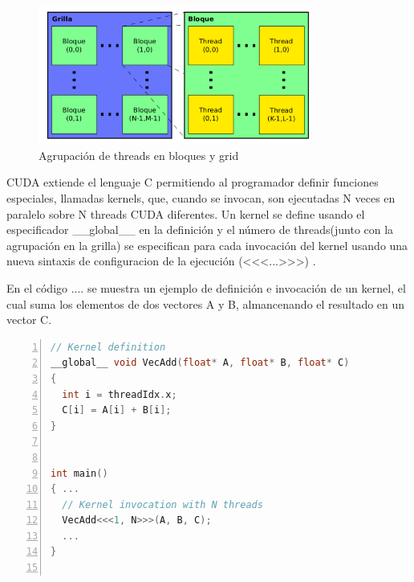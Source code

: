\documentclass[a4paper,10pt]{report}
\begin{document}
\begin{figure}
  \centering
    \includegraphics[width=0.8\textwidth]{img/grilla.png}
  \caption{Agrupación de threads en bloques y grid}
  \label{grilla}
\end{figure}
% 

CUDA extiende el lenguaje C permitiendo al programador definir funciones especiales, llamadas kernels, que, cuando se invocan, son ejecutadas N veces en paralelo sobre N threads CUDA diferentes. 
Un kernel se define usando el especificador \_\_global\_\_ en la definición y el número de threads(junto con la agrupación en la grilla) se especifican para cada invocación del kernel usando
una nueva sintaxis de configuracion de la ejecución (<<<...>>>) . 


En el código .... se muestra un ejemplo de definición e invocación de un kernel, el cual suma los elementos de dos vectores A y B, almancenando el resultado en un vector C.
\begin{lstlisting}[frame=bt,title={aa},caption={imgproc/src/opencl/cvtcolor.cl},
columns=fullflexible,numbers=left,backgroundcolor=\color{LemonChiffon1},basicstyle=\footnotesize,keywordstyle=\ttfamily\footnotesize,language=C++,stringstyle=\ttfamily,breaklines=true,xleftmargin=0.5em,xrightmargin=0pt,aboveskip=\bigskipamount,belowskip=\bigskipamount]
// Kernel definition 
__global__ void VecAdd(float* A, float* B, float* C) 
{ 
  int i = threadIdx.x; 
  C[i] = A[i] + B[i]; 
} 


int main() 
{ ... 
  // Kernel invocation with N threads 
  VecAdd<<<1, N>>>(A, B, C); 
  ... 
}


\end{lstlisting}
\end{document}
